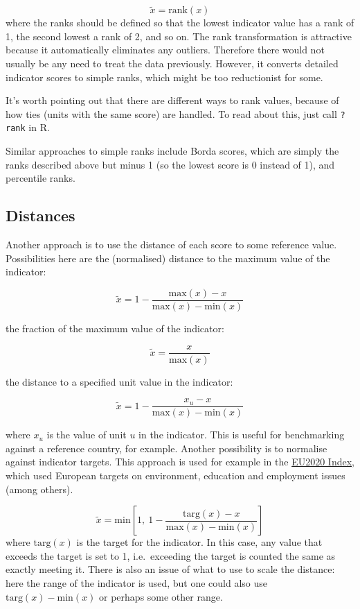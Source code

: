 \documentclass[
]{book}
\begin{document}
\[ \tilde{x} = \text{rank}(x)\]
where the ranks should be defined so that the lowest indicator value has a rank of 1, the second lowest a rank of 2, and so on. The rank transformation is attractive because it automatically eliminates any outliers. Therefore there would not usually be any need to treat the data previously. However, it converts detailed indicator scores to simple ranks, which might be too reductionist for some.

It's worth pointing out that there are different ways to rank values, because of how ties (units with the same score) are handled. To read about this, just call \texttt{?rank} in R.

Similar approaches to simple ranks include Borda scores, which are simply the ranks described above but minus 1 (so the lowest score is 0 instead of 1), and percentile ranks.

\hypertarget{distances}{%
\subsection{Distances}\label{distances}}

Another approach is to use the distance of each score to some reference value. Possibilities here are the (normalised) distance to the maximum value of the indicator:

\[ \tilde{x} = 1 - \frac{\text{max}(x) - x}{\text{max}(x) - \text{min}(x)}\]

the fraction of the maximum value of the indicator:

\[ \tilde{x} = \frac{x}{\text{max}(x)}\]

the distance to a specified unit value in the indicator:

\[ \tilde{x} = 1 - \frac{x_u - x}{\text{max}(x) - \text{min}(x)}\]

where \(x_u\) is the value of unit \(u\) in the indicator. This is useful for benchmarking against a reference country, for example. Another possibility is to normalise against indicator targets. This approach is used for example in the \href{https://www.sciencedirect.com/science/article/pii/S2665972720300593}{EU2020 Index}, which used European targets on environment, education and employment issues (among others).

\[ \tilde{x} = \text{min} \left[1, \  1 - \frac{\text{targ}(x) - x}{\text{max}(x) - \text{min}(x)} \right]\]
where \(\text{targ}(x)\) is the target for the indicator. In this case, any value that exceeds the target is set to 1, i.e.~exceeding the target is counted the same as exactly meeting it. There is also an issue of what to use to scale the distance: here the range of the indicator is used, but one could also use \(\text{targ}(x) - \text{min}(x)\) or perhaps some other range.
\end{document}
